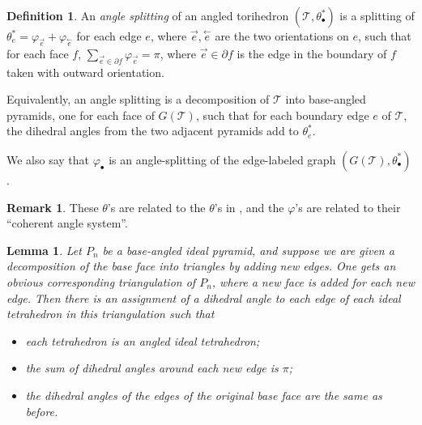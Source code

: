 \documentclass[11pt]{amsart}
\newcommand{\sT}{{\mathcal{T}}}
\newcommand{\cev}[1]{\overset{\leftarrow}{#1}}
\newcommand{\del}{\partial}
\newcommand{\vphi}{\varphi}
\theoremstyle{plain}
\newtheorem{lemma}[theorem]{Lemma}
\theoremstyle{definition}
\newtheorem{definition}[theorem]{Definition}
\newtheorem{remark}[theorem]{Remark}
\begin{document}
\begin{definition}
An \emph{angle splitting} of an angled torihedron $(\sT,\theta_\bullet^*)$
is a splitting of $\theta_e^* = \vphi_{\vec{e}} + \vphi_{\cev{e}}$
for each edge $e$,
where $\vec{e},\cev{e}$ are the two orientations
on $e$,
such that for each face $f$,
$\sum_{\vec{e} \in \del f} \vphi_{\vec{e}} = \pi$,
where $\vec{e} \in \del f$ is the edge in the boundary of $f$
taken with outward orientation.


Equivalently, an angle splitting is a decomposition of
$\sT$ into base-angled pyramids,
one for each face of $G(\sT)$, such that
for each boundary edge $e$ of $\sT$,
the dihedral angles from the two adjacent pyramids
add to $\theta_e^*$.


We also say that $\vphi_\bullet$ is an angle-splitting
of the edge-labeled graph $(G(\sT), \theta_\bullet^*)$.
\end{definition}

\begin{remark}
These $\theta$'s are related to the $\theta$'s in
\cite{BandS},
and the $\vphi$'s are related to their ``coherent angle system''.
\end{remark}



\begin{lemma}
\label{l:pyramid_decomp}
Let $P_n$ be a base-angled ideal pyramid, and suppose we are given a
decomposition of the base face into triangles by adding new edges.  One gets an
obvious corresponding triangulation of $P_n$, where a new face is added for each
new edge. Then there is an assignment of a dihedral angle to each edge of each
ideal tetrahedron in this triangulation such that
\begin{itemize}
\item each tetrahedron is an angled ideal tetrahedron;
\item the sum of dihedral angles around each new edge is $\pi$;
\item the dihedral angles of the edges of the original base face are the same as
	before.
\end{itemize} 
\end{lemma}
\end{document}
